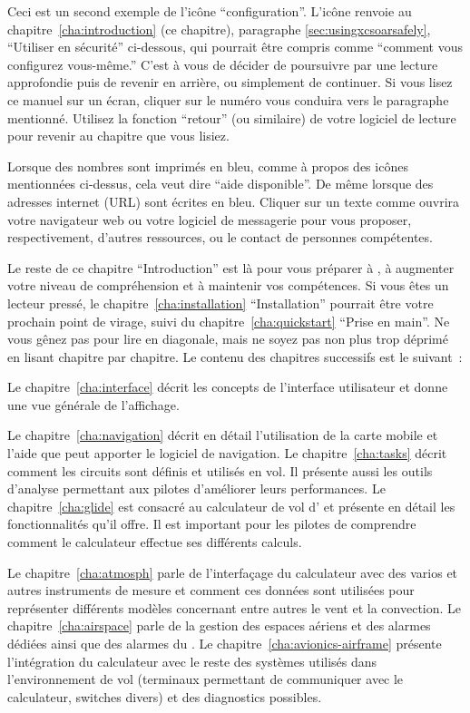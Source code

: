  Ceci est un second exemple de l'icône ``configuration''. L'icône renvoie
au chapitre~\ref{cha:introduction} (ce chapitre), paragraphe 
\ref{sec:usingxcsoarsafely}, ``Utiliser \xc{} en sécurité'' ci-dessous, qui pourrait être 
compris comme ``comment vous configurez vous-même.'' C'est à vous de décider de poursuivre
par une lecture approfondie puis de revenir en arrière, ou simplement de continuer. Si vous lisez ce manuel
sur un écran, cliquer sur le numéro vous conduira vers le paragraphe
mentionné. Utilisez la fonction ``retour'' (ou similaire) de votre
logiciel de lecture pour revenir au chapitre que vous lisiez.

Lorsque des nombres sont imprimés en bleu, comme à propos des icônes mentionnées ci-dessus, cela veut dire ``aide disponible''.
De même lorsque des adresses internet (URL) sont écrites en bleu. 
Cliquer sur un texte comme  ouvrira votre navigateur web
ou votre logiciel de messagerie pour vous proposer, respectivement, d'autres ressources, ou le contact
de personnes compétentes.

Le reste de ce chapitre ``Introduction'' est là pour vous préparer à \xc,
à augmenter votre niveau de compréhension et à maintenir vos compétences.
Si vous êtes un lecteur pressé, le chapitre~\ref{cha:installation} ``Installation'' pourrait être votre prochain point de virage, suivi du chapitre~\ref{cha:quickstart} ``Prise en main''. Ne vous gênez pas pour lire
en diagonale, mais ne soyez pas non plus trop déprimé en lisant chapitre par chapitre. Le contenu des chapitres successifs est le suivant~:

Le chapitre~\ref{cha:interface} décrit les concepts de l'interface utilisateur et donne une vue générale de l'affichage.

Le chapitre~\ref{cha:navigation} décrit en détail l'utilisation de la carte mobile et l'aide que peut apporter le logiciel de navigation. Le chapitre~\ref{cha:tasks} décrit comment les circuits sont définis et utilisés en vol. Il présente aussi les outils d'analyse permettant aux pilotes d'améliorer leurs performances. Le chapitre~\ref{cha:glide} est consacré au calculateur de vol d'\xc{} et présente en détail les fonctionnalités qu'il offre. Il est important pour les pilotes de comprendre comment le calculateur effectue ses différents calculs.

Le chapitre~\ref{cha:atmosph} parle de l'interfaçage du calculateur avec des varios et autres instruments de mesure et comment ces données sont utilisées pour représenter différents modèles concernant entre autres le vent et la convection. Le chapitre~\ref{cha:airspace} parle de la gestion des espaces aériens et des alarmes dédiées ainsi que des alarmes du \fl. Le chapitre~\ref{cha:avionics-airframe} présente l'intégration du calculateur avec le reste des systèmes utilisés dans l'environnement de vol (terminaux permettant de communiquer avec le calculateur, switches divers) et des diagnostics possibles.

